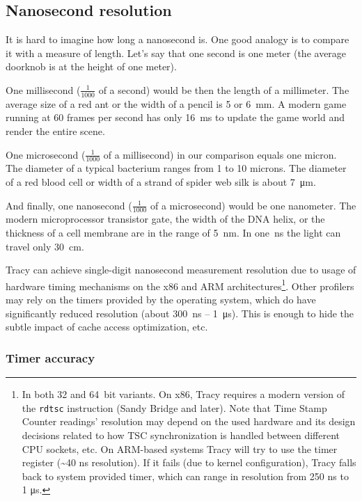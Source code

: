 \documentclass[hidelinks,titlepage,a4paper]{article}
\begin{document}
\subsection{Nanosecond resolution}

It is hard to imagine how long a nanosecond is. One good analogy is to compare it with a measure of length. Let's say that one second is one meter (the average doorknob is at the height of one meter).

One millisecond ($\frac{1}{1000}$ of a second) would be then the length of a millimeter. The average size of a red ant or the width of a pencil is 5 or 6~\si{\milli\metre}. A modern game running at 60 frames per second has only 16~\si{\milli\second} to update the game world and render the entire scene.

One microsecond ($\frac{1}{1000}$ of a millisecond) in our comparison equals one micron. The diameter of a typical bacterium ranges from 1 to 10 microns. The diameter of a red blood cell or width of a strand of spider web silk is about 7~\si{\micro\metre}.

And finally, one nanosecond ($\frac{1}{1000}$ of a microsecond) would be one nanometer. The modern microprocessor transistor gate, the width of the DNA helix, or the thickness of a cell membrane are in the range of 5~\si{\nano\metre}. In one~\si{\nano\second} the light can travel only 30~\si{\centi\meter}.

Tracy can achieve single-digit nanosecond measurement resolution due to usage of hardware timing mechanisms on the x86 and ARM architectures\footnote{In both 32 and 64~bit variants. On x86, Tracy requires a modern version of the \texttt{rdtsc} instruction (Sandy Bridge and later). Note that Time Stamp Counter readings' resolution may depend on the used hardware and its design decisions related to how TSC synchronization is handled between different CPU sockets, etc. On ARM-based systems Tracy will try to use the timer register (\textasciitilde 40 \si{\nano\second} resolution). If it fails (due to kernel configuration), Tracy falls back to system provided timer, which can range in resolution from 250 \si{\nano\second} to 1 \si{\micro\second}.}. Other profilers may rely on the timers provided by the operating system, which do have significantly reduced resolution (about 300~\si{\nano\second} -- 1~\si{\micro\second}). This is enough to hide the subtle impact of cache access optimization, etc.

\subsubsection{Timer accuracy}
\end{document}

